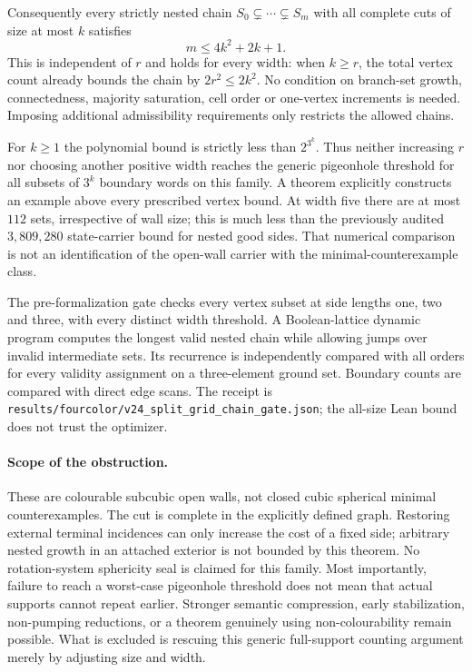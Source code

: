 Consequently every strictly nested chain $S_0\subsetneq\cdots\subsetneq
S_m$ with all complete cuts of size at most $k$ satisfies
\[
 m\leq 4k^2+2k+1.
\]
This is independent of $r$ and holds for every width: when $k\geq r$,
the total vertex count already bounds the chain by $2r^2\leq2k^2$.
No condition on branch-set growth, connectedness, majority saturation,
cell order or one-vertex increments is needed. Imposing additional
admissibility requirements only restricts the allowed chains.

For $k\geq1$ the polynomial bound is strictly less than $2^{3^k}$.
Thus neither increasing $r$ nor choosing another positive width reaches
the generic pigeonhole threshold for all subsets of $3^k$ boundary words
on this family. A theorem explicitly constructs an example above every
prescribed vertex bound. At width five there are at most $112$ sets,
irrespective of wall size; this is much less than the previously audited
$3{,}809{,}280$ state-carrier bound for nested good sides. That numerical
comparison is not an identification of the open-wall carrier with the
minimal-counterexample class.

The pre-formalization gate checks every vertex subset at side lengths
one, two and three, with every distinct width threshold. A Boolean-lattice
dynamic program computes the longest valid nested chain while allowing
jumps over invalid intermediate sets. Its recurrence is independently
compared with all orders for every validity assignment on a three-element
ground set. Boundary counts are compared with direct edge scans. The
receipt is \texttt{results/fourcolor/v24\_split\_grid\_chain\_gate.json};
the all-size Lean bound does not trust the optimizer.

\paragraph{Scope of the obstruction.}
These are colourable subcubic open walls, not closed cubic spherical
minimal counterexamples. The cut is complete in the explicitly defined
graph. Restoring external terminal incidences can only increase the cost
of a fixed side; arbitrary nested growth in an attached exterior is not
bounded by this theorem. No rotation-system sphericity seal is claimed
for this family. Most importantly, failure to reach a worst-case
pigeonhole threshold does not mean that actual supports cannot repeat
earlier. Stronger semantic compression, early stabilization,
non-pumping reductions, or a theorem genuinely using non-colourability
remain possible. What is excluded is rescuing this generic full-support
counting argument merely by adjusting size and width.


